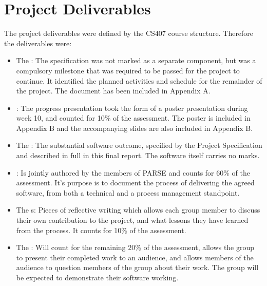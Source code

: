 \section{Project Deliverables}
The project deliverables were defined by the CS407 \cite{ouroboros2007} course structure. Therefore the deliverables were: \begin{itemize}

\item The : The specification was not marked as a separate component, but was a compulsory milestone that was required to be passed for the project to continue. It identified the planned activities and schedule for the remainder of the project. The document has been included in Appendix A.

\item {}:
The progress presentation took the form of a poster presentation during week 10, and counted for 10\% of the assessment. The poster is included in Appendix B and the accompanying slides are also included in Appendix B.

\item The : The substantial software outcome, specified by the Project Specification and described in full in this final report. The software itself carries no marks.

\item {}: Is jointly authored by the members of PARSE and counts for 60\% of the assessment. It's purpose is to document the process of delivering the agreed software, from both a technical and a process management standpoint. 

\item The s: Pieces of reflective writing which allows each group member to discuss their own contribution to the project, and what lessons they have learned from the process. It counts for 10\% of the assessment.

\item The : Will count for the remaining 20\% of the assessment, allows the group to present their completed work to an audience, and allows members of the audience to question members of the group about their work. The group will be expected to demonstrate their software working.\end{itemize}

\pagebreak

